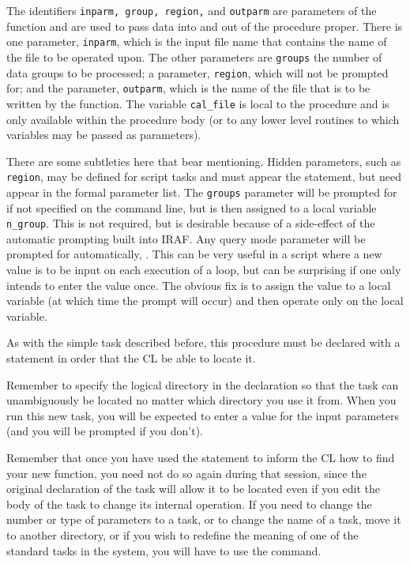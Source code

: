 \noindent
The identifiers {\tt inparm, group, region,} and {\tt outparm} are 
parameters of the function and are used to pass data 
into and out of the procedure proper.
There is one  parameter, {\tt inparm}, which is the input
file name that contains the name of
the file to be operated upon.  The other parameters are {\tt groups}
the number of data groups to be processed;
a  parameter, {\tt region}, which will not be
prompted for; and the parameter, {\tt outparm}, which is
the name of the file that is to be written by the function.  The variable
{\tt cal\_file} is local to the procedure and is only
available within the procedure body (or to any lower level routines to which
variables may be passed as parameters).

There are some subtleties here that bear mentioning. Hidden parameters,
such as {\tt region}, may be defined for script tasks and must appear
 the  statement, but need 
appear in the formal parameter list.   The {\tt groups} parameter will
be prompted for if not specified on the command line,
but is then assigned to a local variable {\tt n\_group}.
This is not required, but is desirable because of a side-effect of the
automatic prompting built into IRAF.  Any query mode parameter will be
prompted for automatically, .
This can be very useful in a script where a new value is to be input
on each execution of a loop, but can be surprising if one only intends
to enter the value once.  The obvious fix is to assign the value to
a local variable (at which time the prompt will occur) and then
operate only on the local variable.

As with the simple task described before, this procedure must be declared
with a  statement in order that the CL be able to locate it.

\begin{quotation}\noindent
{} 
\end{quotation}

\noindent
Remember to specify the logical 
directory in the declaration so that the task can unambiguously
be located no matter which directory you use it from.
When you run this new task, you will be expected to enter a value for
the input parameters (and you will be prompted if you don't).

 Remember that once you 
have used the  statement to inform the CL how to find your
new function, you need not do so again during that session, since the original
declaration of the task will allow it to be located even if you edit the body
of the task to change its internal operation.  
If you need to change the number or type of parameters to a task, 
or to change the name of a task, move it to another directory,
or if you wish to redefine the meaning of one of the standard tasks 
in the system, you will have to use the  command.

